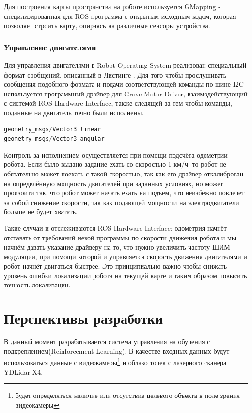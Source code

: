 \documentclass[12pt,a4paper]{scrartcl}
\begin{document}
					Для построения карты пространства на роботе используется GMapping - специлизированная для ROS программа с открытым исходным кодом, которая позволяет строить карту, опираясь на различные сенсоры устройства.
					
				\subsubsection{Управление двигателями}
					Для управления двигателями в Robot Operating System реализован специальный формат сообщений, описанный в Листинге . Для того чтобы прослушивать сообщения подобного формата и подачи соответствующей команды по шине I2C используется программный драйвер для Grove Motor Driver, взаимодействующий с системой ROS Hardware Interface, также следящей за тем чтобы команды, поданные на двигатель точно были исполнены.
					
					\begin{lstlisting}[language=C,caption={Формат сообщения geometry\_msgs/Twist Message\cite{bib:ROSTwistMsg}},label={lst:TwistMsg}]
geometry_msgs/Vector3 linear
geometry_msgs/Vector3 angular
					\end{lstlisting}
					
					Контроль за исполнением осуществляется при помощи подсчёта одометрии робота. Если было выдано задание ехать со скоростью 1 км/ч, то робот не обязательно может поехать с такой скоростью, так как его драйвер откалиброван на определённую мощность двигателей при заданных условиях, но может произойти так, что робот может начать ехать на подъём, что неизбежно повлечёт за собой снижение скорости, так как подающей мощности на электродвигатели больше не будет хватать. 
					
					Такие случаи и отслеживаются ROS Hardware Interface: одометрия начнёт отставать от требований некой программы по скорости движения робота и мы начнём давать указание драйверу на то, что нужно увеличить частоту ШИМ модуляции, при помощи которой и управляется скорость движения двигателями и робот начнёт двигаться быстрее. Это принципиально важно чтобы снижать уровень ошибки локализации робота на текущей карте и таким образом повысить точность локализации.
			
		\section{Перспективы разработки} \label{sec:perspective}
			В данный момент разрабатывается система управления на обучения с подкреплением(Reinforcement Learning). В качестве входных данных будут использоваться данные с видеокамеры\footnote{будет определяться наличие или отсутствие целевого объекта в поле зрения видеокамеры} и облако точек с лазерного сканера YDLidar X4.
			
\end{document}
